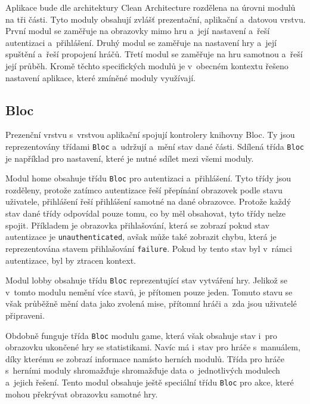 Aplikace bude dle architektury Clean Architecture rozdělena
na úrovni modulů na tři části.
Tyto moduly obsahují zvlášť prezentační, aplikační a~datovou vrstvu.
První modul se zaměřuje na obrazovky mimo hru a~její nastavení
a~řeší autentizaci a~přihlášení.
Druhý modul se zaměřuje na nastavení hry a~její spuštění a~řeší propojení hráčů.
Třetí modul se zaměřuje na hru samotnou a~řeší její průběh.
Kromě těchto specifických modulů je v~obecném kontextu řešeno nastavení
aplikace,
které zmíněné moduly využívají.

\subsection{Bloc}

Prezenční vrstvu s~vrstvou aplikační spojují kontrolery knihovny Bloc.
Ty jsou reprezentovány třídami \texttt{Bloc} a~udržují a~mění stav
dané části.
Sdílená třída \texttt{Bloc} je například pro nastavení,
které je nutné sdílet mezi všemi moduly.

Modul home obsahuje třídu \texttt{Bloc} pro autentizaci a~přihlášení.
Tyto třídy jsou rozděleny,
protože zatímco autentizace řeší přepínání obrazovek podle stavu uživatele,
přihlášení řeší přihlášení samotné na dané obrazovce.
Protože každý stav dané třídy odpovídal pouze tomu,
co by měl obsahovat,
tyto třídy nelze spojit.
Příkladem je obrazovka přihlašování,
která se zobrazí pokud stav autentizace je \texttt{unauthenticated},
avšak může také zobrazit chybu,
která je reprezentována stavem přihlašování \texttt{failure}.
Pokud by tento stav byl v~rámci autentizace,
byl by ztracen kontext.

Modul lobby obsahuje třídu \texttt{Bloc} reprezentující stav
vytváření hry.
Jelikož se v~tomto modulu nemění více stavů,
je přítomen pouze jeden.
Tomuto stavu se však průběžně mění data jako zvolená mise,
přítomní hráči a~zda jsou uživatelé připraveni.

Obdobně funguje třída \texttt{Bloc} modulu game,
která však obsahuje stav i~pro obrazovku ukončené hry se statistikami.
Navíc má i~stav pro hráče s~manuálem,
díky kterému se zobrazí informace namísto herních modulů.
Třída pro hráče s~herními moduly shromažďuje shromažďuje data o~jednotlivých
modulech a~jejich řešení.
Tento modul obsahuje ještě speciální třídu \texttt{Bloc} pro akce,
které mohou překrývat obrazovku samotné hry.
